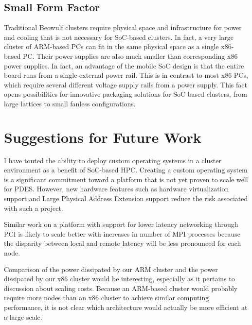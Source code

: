 \documentclass[11pt]{book}
\begin{document}
\subsection{\textbf{Small Form Factor}}

Traditional Beowulf clusters require physical space and infrastructure for power
and cooling that is not necessary for SoC-based clusters. In fact, a very large
cluster of ARM-based PCs can fit in the same physical space as a single
x86-based PC. Their power supplies are also much smaller than corresponding x86
power supplies. In fact, an advantage of the mobile SoC design is that the
entire board runs from a single external power rail. This is in contrast to most
x86 PCs, which require several different voltage supply rails from a power
supply. This fact opens possibilities for innovative packaging solutions for
SoC-based clusters, from large lattices to small fanless configurations.

\section{\textbf{Suggestions for Future Work}}

I have touted the ability to deploy custom operating systems in a cluster
environment as a benefit of SoC-based HPC. Creating a custom operating
system is a significant commitment toward a platform that is not yet proven to
scale well for PDES. However, new hardware features such as hardware
virtualization support and Large Physical Address Extension support reduce the
risk associated with such a project.

Similar work on a platform with support for lower latency networking through PCI
is likely to scale better with increases in number of MPI processes because the
disparity between local and remote latency will be less pronounced for each
node.

Comparison of the power dissipated by our ARM cluster and the power dissipated
by our x86 cluster would be interesting, especially as it pertains to discussion
about scaling costs. Because an ARM-based cluster would probably require more
nodes than an x86 cluster to achieve similar computing performance, it is not
clear which architecture would actually be more efficient at a large scale.

\newpage
 
\end{document}
